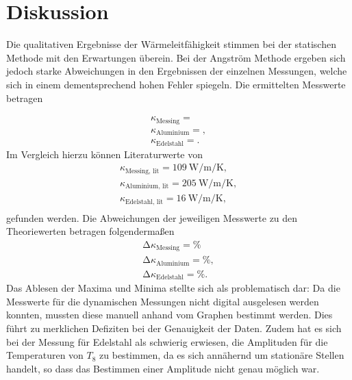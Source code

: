 \section{Diskussion}
\label{sec:Diskussion}
Die qualitativen Ergebnisse der Wärmeleitfähigkeit stimmen bei der statischen Methode mit den Erwartungen überein.
Bei der Angström Methode ergeben sich jedoch starke Abweichungen in den Ergebnissen der einzelnen Messungen, welche sich in einem dementsprechend hohen Fehler spiegeln.
Die ermittelten Messwerte betragen

\begin{align*}
  \kappa_\text{Messing} =  \\
  \kappa_\text{Aluminium} = ,\\
  \kappa_\text{Edelstahl} = .
\end{align*}
Im Vergleich hierzu können Literaturwerte \cite{etb} von
\begin{align*}
  \kappa_\text{Messing, lit} = \SI{109}{\watt\per\metre\per\kelvin}, \\
  \kappa_\text{Aluminium, lit} = \SI{205}{\watt\per\metre\per\kelvin}, \\
  \kappa_\text{Edelstahl, lit} = \SI{16}{\watt\per\metre\per\kelvin}, \\
\end{align*}
gefunden werden.
Die Abweichungen der jeweiligen Messwerte zu den Theoriewerten betragen folgendermaßen
\begin{align*}
  \increment \kappa_\text{Messing} =  \si{\percent}\\
  \increment \kappa_\text{Aluminium} =  \si{\percent},\\
  \increment \kappa_\text{Edelstahl} =  \si{\percent}.
\end{align*}
Das Ablesen der Maxima und Minima stellte sich als problematisch dar:
Da die Messwerte für die dynamischen Messungen nicht digital ausgelesen werden konnten, mussten diese manuell anhand vom Graphen bestimmt werden.
Dies führt zu merklichen Defiziten bei der Genauigkeit der Daten.
Zudem hat es sich bei der Messung für Edelstahl als schwierig erwiesen, die Amplituden für die Temperaturen von $T_8$ zu bestimmen, da es sich annähernd um stationäre Stellen handelt, so dass das Bestimmen einer Amplitude nicht genau möglich war.
